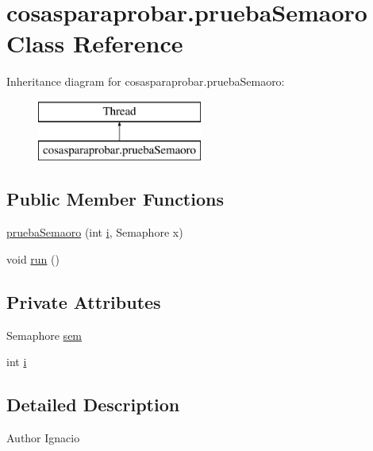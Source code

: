 \hypertarget{classcosasparaprobar_1_1prueba_semaoro}{}\section{cosasparaprobar.\+prueba\+Semaoro Class Reference}
\label{classcosasparaprobar_1_1prueba_semaoro}
Inheritance diagram for cosasparaprobar.\+prueba\+Semaoro\+:\begin{figure}[H]
\begin{center}
\leavevmode
\includegraphics[height=2.000000cm]{classcosasparaprobar_1_1prueba_semaoro}
\end{center}
\end{figure}
\subsection*{Public Member Functions}
\begin{DoxyCompactItemize}
\item 
\mbox{\hyperlink{classcosasparaprobar_1_1prueba_semaoro_a73082d9634e3a14bcdc678355a0930ca}{prueba\+Semaoro}} (int \mbox{\hyperlink{classcosasparaprobar_1_1prueba_semaoro_a9b8c78f7d8f806c59eef71f170426c0b}{i}}, Semaphore x)
\item 
void \mbox{\hyperlink{classcosasparaprobar_1_1prueba_semaoro_ad522317dbe89134e39ce5c5e3cd06adc}{run}} ()
\end{DoxyCompactItemize}
\subsection*{Private Attributes}
\begin{DoxyCompactItemize}
\item 
Semaphore \mbox{\hyperlink{classcosasparaprobar_1_1prueba_semaoro_aff63c1c25145c5470c86f8b97fa93c81}{sem}}
\item 
int \mbox{\hyperlink{classcosasparaprobar_1_1prueba_semaoro_a9b8c78f7d8f806c59eef71f170426c0b}{i}}
\end{DoxyCompactItemize}


\subsection{Detailed Description}
\begin{DoxyAuthor}{Author}
Ignacio 
\end{DoxyAuthor}


